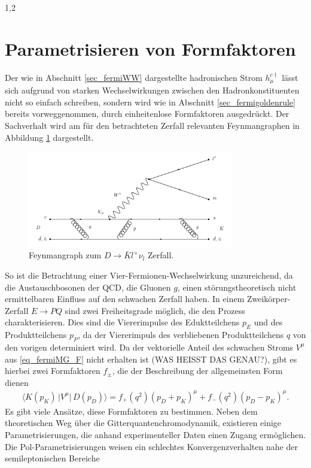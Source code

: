 \documentclass[11pt,a4paper,twoside,draft]{report}
\begin{document}
\begin{spacing}{1,2}
\section{Parametrisieren von Formfaktoren}
\label{sec_paramForm}
Der wie in Abschnitt \ref{sec_fermiWW} dargestellte hadronischen Strom $h_\mu^{c\dagger}$ lässt sich aufgrund von starken Wechselwirkungen zwischen den 
Hadronkonstituenten nicht so einfach schreiben, sondern wird wie in Abschnitt \ref{sec_fermigoldenrule} bereits vorweggenommen, durch einheitenlose Formfaktoren 
ausgedrückt\cite{KimPham}. Der Sachverhalt wird am für den betrachteten Zerfall relevanten Feynmangraphen in Abbildung \ref{pic_Dfeyn} dargestellt.
\begin{figure}[H]
\includegraphics[width=0.8\textwidth]{Abbildungen/DFeyn.png}
\caption{Feynmangraph zum $D\rightarrow \bar K l^+ \nu_l$ Zerfall.}
\label{pic_Dfeyn}
\end{figure}
\noindent
So ist die Betrachtung einer Vier-Fermionen-Wechselwirkung unzureichend, da die Austauschbosonen der QCD, die Gluonen $g$, einen störungstheoretisch nicht
ermittelbaren Einfluss auf den schwachen Zerfall haben.
In einem Zweikörper-Zerfall $E\rightarrow PQ$ sind zwei Freiheitsgrade möglich, die den Prozess charakterisieren. Dies sind die Viererimpulse des Eduktteilchens
$p_E$ und des Produktteilchens $p_P$, da der Viererimpuls des verbliebenen Produktteilchens $q$ von den vorigen determiniert wird. Da der vektorielle 
Anteil des schwachen Stroms $V^\mu$ aus \eqref{eq_fermiMG_F} nicht erhalten ist (WAS HEISST DAS GENAU?), gibt es hierbei zwei Formfaktoren $f_\pm$, die der 
Beschreibung der allgemeinsten Form dienen
\begin{align}
 \big\langle K(p_K)\,\big|V^\mu\big|\, D(p_D)\big\rangle = f_+(q^2)(p_D+p_K)^\mu + f_-(q^2)(p_D-p_K)^\mu.
\end{align}
Es gibt viele Ansätze, diese Formfaktoren zu bestimmen. Neben dem theoretischen Weg über die Gitterquantenchromodynamik, existieren einige Parametrisierungen,
die anhand experimenteller Daten einen Zugang ermöglichen. Die Pol-Parametrisierungen weisen ein schlechtes Konvergenzverhalten nahe der semileptonischen Bereiche

\end{spacing}
\end{document}
